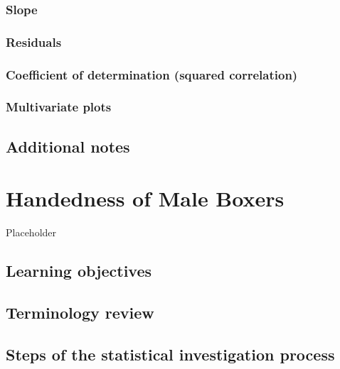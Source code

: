 \documentclass[
]{report}
\begin{document}
\hypertarget{slope}{%
\subsection{Slope}\label{slope}}

\hypertarget{residuals}{%
\subsection{Residuals}\label{residuals}}

\hypertarget{coefficient-of-determination-squared-correlation}{%
\subsection{Coefficient of determination (squared correlation)}\label{coefficient-of-determination-squared-correlation}}

\hypertarget{multivariate-plots}{%
\subsection{Multivariate plots}\label{multivariate-plots}}

\hypertarget{additional-notes}{%
\section{Additional notes}\label{additional-notes}}

\hypertarget{handedness-of-male-boxers}{%
\chapter{Handedness of Male Boxers}\label{handedness-of-male-boxers}}

Placeholder

\hypertarget{learning-objectives}{%
\section{Learning objectives}\label{learning-objectives}}

\hypertarget{terminology-review}{%
\section{Terminology review}\label{terminology-review}}

\hypertarget{steps-of-the-statistical-investigation-process}{%
\section{Steps of the statistical investigation process}\label{steps-of-the-statistical-investigation-process}}
\end{document}
